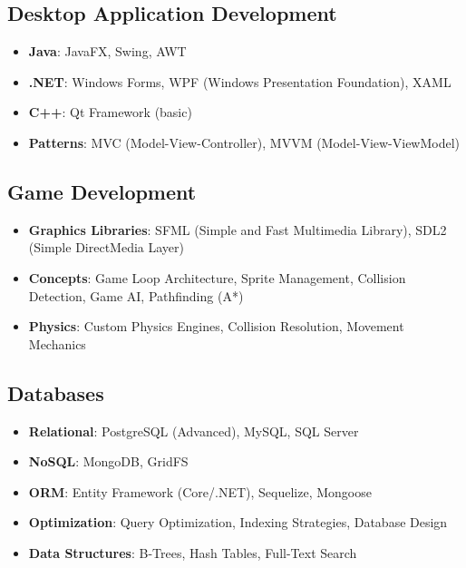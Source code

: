\documentclass[a4paper,12pt]{article}
\begin{document}
\subsection*{Desktop Application Development}
\begin{itemize}[nosep,after=\strut, leftmargin=1em, itemsep=1pt]
\item \textbf{Java}: JavaFX, Swing, AWT
\item \textbf{.NET}: Windows Forms, WPF (Windows Presentation Foundation), XAML
\item \textbf{C++}: Qt Framework (basic)
\item \textbf{Patterns}: MVC (Model-View-Controller), MVVM (Model-View-ViewModel)
\end{itemize}

\subsection*{Game Development}
\begin{itemize}[nosep,after=\strut, leftmargin=1em, itemsep=1pt]
\item \textbf{Graphics Libraries}: SFML (Simple and Fast Multimedia Library), SDL2 (Simple DirectMedia Layer)
\item \textbf{Concepts}: Game Loop Architecture, Sprite Management, Collision Detection, Game AI, Pathfinding (A*)
\item \textbf{Physics}: Custom Physics Engines, Collision Resolution, Movement Mechanics
\end{itemize}

\subsection*{Databases}
\begin{itemize}[nosep,after=\strut, leftmargin=1em, itemsep=1pt]
\item \textbf{Relational}: PostgreSQL (Advanced), MySQL, SQL Server
\item \textbf{NoSQL}: MongoDB, GridFS
\item \textbf{ORM}: Entity Framework (Core/.NET), Sequelize, Mongoose
\item \textbf{Optimization}: Query Optimization, Indexing Strategies, Database Design
\item \textbf{Data Structures}: B-Trees, Hash Tables, Full-Text Search
\end{itemize}
\end{document}
